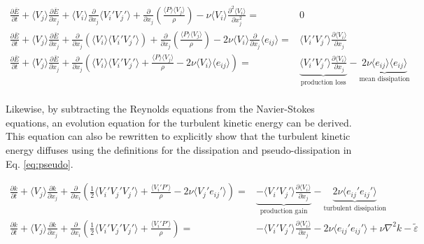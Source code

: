\documentclass[10pt]{article}
\newcommand{\beqa}{\begin{equation}\begin{aligned}}
\newcommand{\eeqa}{\end{aligned}\end{equation}}
\newcommand{\la}{\langle}
\newcommand{\ra}{\rangle}
\begin{document}
\begin{flushleft}
\beqa
\frac{\partial\bar{E}}{\partial t}+\la V_j\ra\frac{\partial\bar{E}}{\partial x_j}+\la V_i\ra\frac{\partial}{\partial x_j}\la V_i'V_j'\ra+\frac{\partial}{\partial x_j}\left(\frac{\la P\ra\la V_j\ra}{\rho}\right)-\nu\la V_i\ra\frac{\partial^2\la V_i\ra}{\partial x_j^2}=&0\\
\frac{\partial\bar{E}}{\partial t}+\la V_j\ra\frac{\partial\bar{E}}{\partial x_j}+\frac{\partial}{\partial x_j}\left(\la V_i\ra\la V_i'V_j'\ra\right)+\frac{\partial}{\partial x_j}\left(\frac{\la P\ra\la V_j\ra}{\rho}\right)-2\nu\la V_i\ra\frac{\partial}{\partial x_j}\la e_{ij}\ra=&\la V_i'V_j'\ra\frac{\partial \la V_i\ra}{\partial x_j}\\
\frac{\partial\bar{E}}{\partial t}+\la V_j\ra\frac{\partial\bar{E}}{\partial x_j}+\frac{\partial}{\partial x_j}\left(\la V_i\ra\la V_i'V_j'\ra+\frac{\la P\ra\la V_j\ra}{\rho}-2\nu\la V_i\ra\la e_{ij}\ra\right)=&\underbrace{\la V_i'V_j'\ra\frac{\partial \la V_i\ra}{\partial x_j}}_{\textrm{production loss}}-\underbrace{2\nu\la e_{ij}\ra\la e_{ij}\ra}_{\textrm{mean dissipation}}\\
\eeqa

Likewise, by subtracting the Reynolds equations from the Navier-Stokes equations, an evolution equation for the turbulent kinetic energy can be derived. This equation can also be rewritten to explicitly show that the turbulent kinetic energy diffuses using the definitions for the dissipation and pseudo-dissipation in Eq. \eqref{eq:pseudo}.

\beqa
\frac{\partial k}{\partial t}+\la V_j\ra\frac{\partial k}{\partial x_j}+\frac{\partial}{\partial x_i}\left(\frac{1}{2}\la V_i'V_j'V_j'\ra+\frac{\la V_i'P'\ra}{\rho}-2\nu\la V_j'e_{ij}'\ra\right)=&\underbrace{-\la V_i'V_j'\ra\frac{\partial\la V_i\ra}{\partial x_j}}_{\textrm{production gain}}-\underbrace{2\nu\la e_{ij}'e_{ij}'\ra}_{\textrm{turbulent dissipation}}\\
\frac{\partial k}{\partial t}+\la V_j\ra\frac{\partial k}{\partial x_j}+\frac{\partial}{\partial x_i}\left(\frac{1}{2}\la V_i'V_j'V_j'\ra+\frac{\la V_i'P'\ra}{\rho}\right)=&-\la V_i'V_j'\ra\frac{\partial\la V_i\ra}{\partial x_j}-2\nu\la e_{ij}'e_{ij}'\ra+\nu\nabla^2 k-\tilde{\varepsilon}
\eeqa


\end{flushleft}
\end{document}
